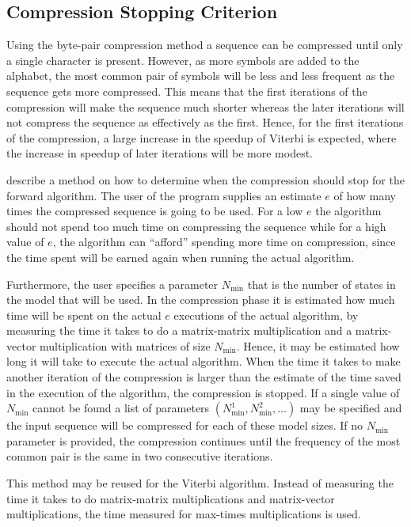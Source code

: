 \subsection{Compression Stopping Criterion}
\label{sec:compr-stopp-crit}

Using the byte-pair compression method a sequence can be compressed until only
a single character is present. However, as more symbols are added to the
alphabet, the most common pair of symbols will be less and less frequent as the
sequence gets more compressed. This means that the first iterations of the
compression will make the sequence much shorter whereas the later iterations
will not compress the sequence as effectively as the first. Hence, for the
first iterations of the compression, a large increase in the speedup of Viterbi
is expected, where the increase in speedup of later iterations will be more
modest.

\citet{sand2013ziphmmlib} describe a method on how to determine when the
compression should stop for the forward algorithm. The user of the program
supplies an estimate $e$ of how many times the compressed sequence is going to
be used. For a low $e$ the algorithm should not spend too much time on
compressing the sequence while for a high value of $e$, the algorithm can
``afford'' spending more time on compression, since the time spent will be
earned again when running the actual algorithm.

Furthermore, the user specifies a parameter $N_{\text{min}}$ that is the number
of states in the model that will be used. In the compression phase it is
estimated how much time will be spent on the actual $e$ executions of the
actual algorithm, by measuring the time it takes to do a matrix-matrix
multiplication and a matrix-vector multiplication with matrices of size
$N_{\text{min}}$. Hence, it may be estimated how long it will take to execute
the actual algorithm. When the time it takes to make another iteration of the
compression is larger than the estimate of the time saved in the execution of
the algorithm, the compression is stopped. If a single value of
$N_{\text{min}}$ cannot be found a list of parameters
$(N_{\text{min}}^1, N_{\text{min}}^2, \dots)$ may be specified and the input
sequence will be compressed for each of these model sizes. If no
$N_{\text{min}}$ parameter is provided, the compression continues until the
frequency of the most common pair is the same in two consecutive iterations.

This method may be reused for the Viterbi algorithm. Instead of measuring the
time it takes to do matrix-matrix multiplications and matrix-vector
multiplications, the time measured for max-times multiplications is used.

